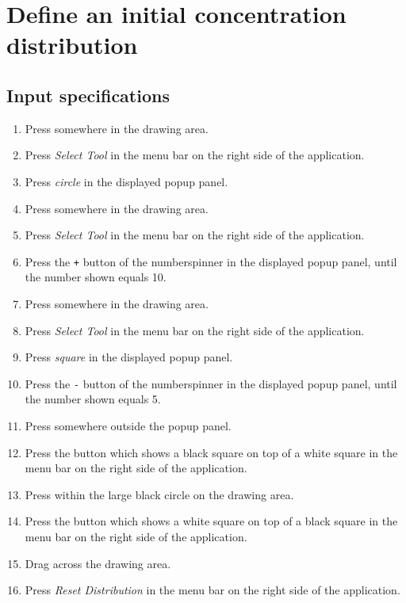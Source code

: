 \section{Define an initial concentration distribution}

\subsection*{Input specifications}
\begin{enumerate}
\item Press somewhere in the drawing area.
\item Press \emph{Select Tool} in the menu bar on the right side of the application.
\item Press \emph{circle} in the displayed popup panel.
\item Press somewhere in the drawing area.
\item Press \emph{Select Tool} in the menu bar on the right side of the application.
\item Press the \texttt{+} button of the numberspinner in the displayed popup panel, until the number shown equals 10.
\item Press somewhere in the drawing area.
\item Press \emph{Select Tool} in the menu bar on the right side of the application. 
\item Press \emph{square} in the displayed popup panel.
\item Press the \texttt{-} button of the numberspinner in the displayed popup panel, until the number shown equals 5.
\item Press somewhere outside the popup panel.
\item Press the button which shows a black square on top of a white square in the menu bar on the right side of the application. 
\item Press within the large black circle on the drawing area.
\item Press the button which shows a white square on top of a black square in the menu bar on the right side of the application. 
\item Drag across the drawing area.
\item Press \emph{Reset Distribution} in the menu bar on the right side of the application. 
\end{enumerate}

